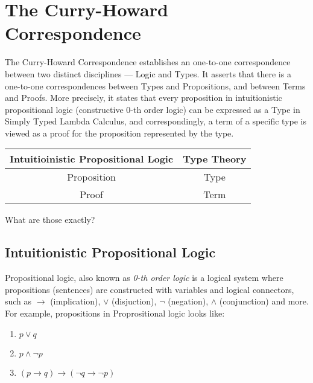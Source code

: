 \section{The Curry-Howard Correspondence}

The Curry-Howard Correspondence establishes an one-to-one correspondence between
two distinct disciplines --- Logic and Types. It asserts that there is a
one-to-one correspondences between Types and Propositions, and between Terms and
Proofs. More precisely, it states that every proposition in intuitionistic
propositional logic (constructive 0-th order logic) can be expressed as a Type
in Simply Typed Lambda Calculus, and correspondingly, a term of a specific type
is viewed as a proof for the proposition represented by the type.

\begin{tabular}{c|c}
Intuitioinistic Propositional Logic & Type Theory\\
\hline
Proposition & Type\\
Proof & Term
\end{tabular}

What are those exactly?

\subsection{Intuitionistic Propositional Logic}

Propositional logic, also known as \emph{0-th order logic} is a logical system
where propositions (sentences) are constructed with variables and logical
connectors, such as $\to$ (implication), $\vee$ (disjuction), $\neg$ (negation),
$\wedge$ (conjunction) and more. For example, propositions in Proprositional
logic looks like:

\begin{enumerate}
    \item $p\vee q$
    \item $p\wedge \neg p$
    \item $(p\to q)\to (\neg q\to\neg p)$
\end{enumerate}

